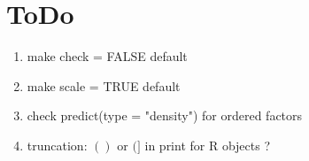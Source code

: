 
\section{ToDo}

\begin{enumerate}
\item make check = FALSE default
\item make scale = TRUE default
\item check predict(type = "density") for ordered factors
\item truncation: $()$ or $(]$ in print for R objects ?
\end{enumerate}
